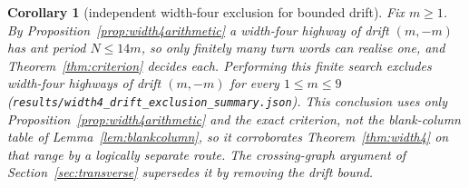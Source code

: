 \documentclass[11pt,reqno]{amsart}
\theoremstyle{plain}
\newtheorem{corollary}[theorem]{Corollary}
\theoremstyle{definition}
\begin{document}
\begin{corollary}[independent width-four exclusion for bounded drift]\label{cor:width4bounded}
Fix $m\ge1$. By Proposition~\ref{prop:width4arithmetic} a width-four highway of drift
$(m,-m)$ has ant period $N\le14m$, so only finitely many turn words can realise one,
and Theorem~\ref{thm:criterion} decides each. Performing this finite search excludes
width-four highways of drift $(m,-m)$ for every $1\le m\le9$
(\texttt{results/width4\_drift\_exclusion\_summary.json}). This conclusion uses only
Proposition~\ref{prop:width4arithmetic} and the exact criterion, not the
blank-column table of Lemma~\ref{lem:blankcolumn}, so it corroborates
Theorem~\ref{thm:width4} on that range by a logically separate route. The
crossing-graph argument of Section~\ref{sec:transverse} supersedes it by removing the
drift bound.
\end{corollary}
\end{document}
